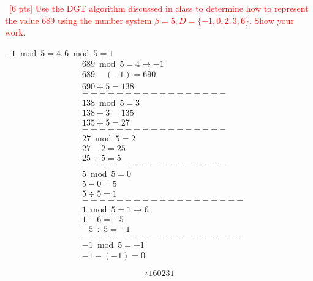 \documentclass[12pt]{article}
\newenvironment{sol}[1][Solution]{\begin{trivlist}\item[\hskip\labelsep {\bfseries #1:}]}{\end{trivlist}}
\begin{document}
\begin{enumerate}
\begin{enumerate}
    \end{enumerate}
    \textcolor{red}{\item \ [6 pts] Use the DGT algorithm discussed in class to determine how to represent the value 689 using the number system $ \beta=5, D = \{ -1, 0, 2, 3 ,6 \}$. Show your work.}
    \begin{sol}
    $-1 \bmod 5 = 4, 6 \bmod 5 = 1 $
    \begin{align*}
        & 689 \bmod 5 = 4 \rightarrow -1\\
        & 689 - (-1) = 690 \\
        & 690 \div 5 = 138 \\
        & ----------------- \\
        & 138 \bmod 5 = 3 \\
        & 138 - 3 = 135 \\
        & 135 \div 5 = 27 \\
        & ----------------- \\
        & 27 \bmod 5 = 2 \\
        & 27 - 2 = 25 \\
        & 25 \div 5 = 5 \\ 
        & ----------------- \\
        & 5 \bmod 5 = 0\\
        & 5 - 0 = 5\\
        & 5 \div 5 = 1\\
        & -------------------\\
        & 1 \bmod 5 = 1 \rightarrow 6\\
        & 1 - 6 = -5\\
        & -5 \div 5 = -1\\
        & -------------------\\
        & -1 \bmod 5 = -1 \\
        & -1 - (-1) = 0 \\
    \end{align*}
    \begin{align*}
        \therefore \bar{1}6023\bar{1}
    \end{align*}

    \end{sol}


\end{enumerate}
\end{document}
